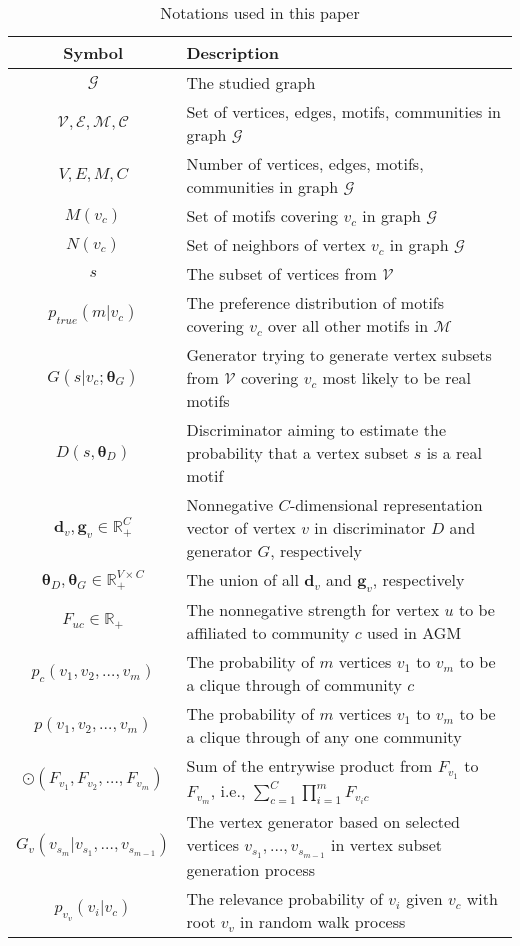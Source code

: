 \documentclass[sigconf]{acmart}
\begin{document}
\begin{table}[tbp]
  \footnotesize
  \caption{Notations used in this paper}
  \label{tab:notation}
  \begin{tabular}{c|p{4.9cm}}
    \toprule
    Symbol&Description\\
    \midrule
  $\mathcal{G}$       & The studied graph \\
  $\mathcal{V}, \mathcal{E}, \mathcal{M}, \mathcal{C}$       & Set of vertices, edges, motifs, communities in graph $\mathcal{G}$ \\
  $V, E, M, C$        & Number of vertices, edges, motifs, communities in graph $\mathcal{G}$ \\
  $M(v_c)$            & Set of motifs covering $v_c$ in graph $\mathcal{G}$  \\
  $N(v_c)$            & Set of neighbors of vertex $v_c$ in graph $\mathcal{G}$  \\
  $s$                 & The subset of vertices from $\mathcal{V}$ \\
  $p_{true}(m|v_c)$   & The preference distribution of motifs covering $v_c$ over all other motifs in $\mathcal{M}$ \\
  $G(s|v_c;\mathbf{\theta}_G)$ & Generator trying to generate vertex subsets from $\mathcal{V}$ covering $v_c$ most likely to be real motifs \\
  $D(s, \mathbf{\theta}_D)$    & Discriminator aiming to estimate the probability that a vertex subset $s$ is a real motif  \\
  $\mathbf{d}_v, \mathbf{g}_v \in \mathbb{R}_+^C$ & Nonnegative $C$-dimensional representation vector of vertex $v$ in discriminator $D$ and generator $G$, respectively \\
  $\mathbf{\theta}_D, \mathbf{\theta}_G \in \mathbb{R}_+^{V \times C}$ & The union of all $\mathbf{d}_v$ and $\mathbf{g}_v$, respectively \\
  $F_{uc} \in \mathbb{R}_+$            & The nonnegative strength for vertex $u$ to be affiliated to community $c$ used in AGM \\
  $p_c(v_1, v_2, \ldots , v_m)$ & The probability of $m$ vertices $v_1$ to $v_m$ to be a clique through of community $c$ \\
  $p(v_1, v_2, \ldots , v_m)$ & The probability of $m$ vertices $v_1$ to $v_m$ to be a clique through of any one community \\
  $\odot(F_{v_1},F_{v_2},\ldots ,F_{v_m})$ & Sum of the entrywise product from $F_{v_1}$ to $F_{v_m}$, i.e., $\sum_{c=1}^{C}\prod_{i=1}^{m}F_{v_ic}$ \\
  $G_v(v_{s_m}|v_{s_1},\ldots ,v_{s_{m-1}})$ & The vertex generator based on selected vertices $v_{s_1},\ldots ,v_{s_{m-1}}$ in vertex subset generation process\\
  $p_{v_v}(v_i|v_c)$ & The relevance probability of $v_i$ given $v_c$ with root $v_v$ in random walk process \\
  \bottomrule
\end{tabular}
\end{table}
\end{document}
